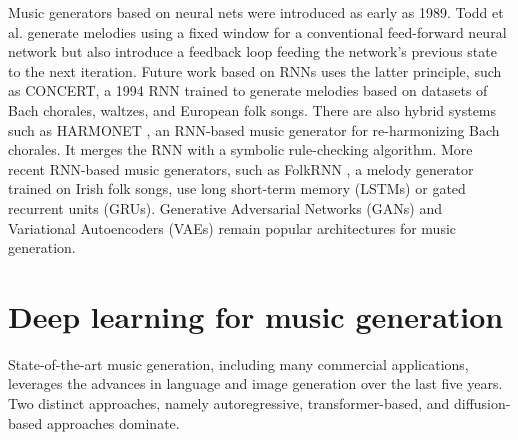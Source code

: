 Music generators based on neural nets were introduced as early as 1989. Todd et al. \cite{Todd_1989} generate melodies using a fixed window for a conventional feed-forward neural network but also introduce a feedback loop feeding the network's previous state to the next iteration. Future work based on RNNs uses the latter principle, such as CONCERT,\cite{Mozer_1994} a 1994 RNN trained to generate melodies based on datasets of Bach chorales, waltzes, and European folk songs. There are also hybrid systems such as HARMONET \cite{Hild_Feulner_Menzel_1991}, an RNN-based music generator for re-harmonizing Bach chorales. It merges the RNN with a symbolic rule-checking algorithm. More recent RNN-based music generators, such as FolkRNN \cite{Sturm_Ben-Tal_2016}, a melody generator trained on Irish folk songs, use long short-term memory (LSTMs) or gated recurrent units (GRUs). Generative Adversarial Networks (GANs) and Variational Autoencoders (VAEs) remain popular architectures for music generation. \cite{Civit_Civit-Masot_Cuadrado_Escalona_2022}

\section{Deep learning for music generation}\label{section:deep_learning_generation}
State-of-the-art music generation, including many commercial applications, leverages the advances in language and image generation over the last five years. Two distinct approaches, namely autoregressive, transformer-based, and diffusion-based approaches dominate.



